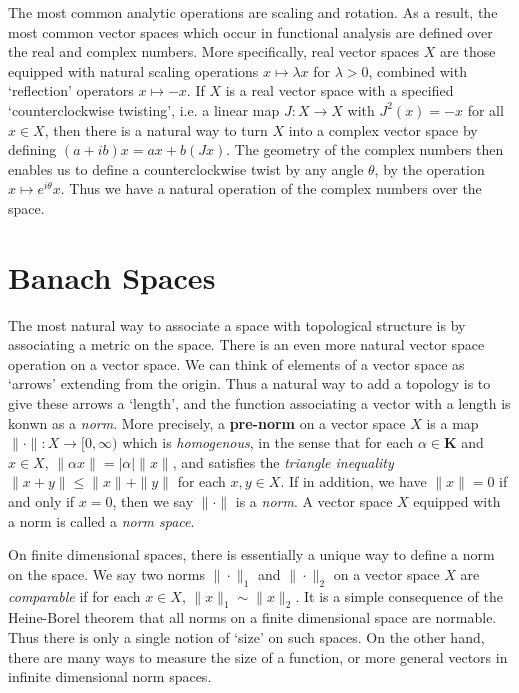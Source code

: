 The most common analytic operations are scaling and rotation. As a result, the most common vector spaces which occur in functional analysis are defined over the real and complex numbers. More specifically, real vector spaces $X$ are those equipped with natural scaling operations $x \mapsto \lambda x$ for $\lambda > 0$, combined with `reflection' operators $x \mapsto -x$. If $X$ is a real vector space with a specified `counterclockwise twisting', i.e. a linear map $J: X \to X$ with $J^2(x) = -x$ for all $x \in X$, then there is a natural way to turn $X$ into a complex vector space by defining $(a + ib)x = ax + b(Jx)$. The geometry of the complex numbers then enables us to define a counterclockwise twist by any angle $\theta$, by the operation $x \mapsto e^{i\theta} x$. Thus we have a natural operation of the complex numbers over the space.





\chapter{Banach Spaces}

The most natural way to associate a space with topological structure is by associating a metric on the space. There is an even more natural vector space operation on a vector space. We can think of elements of a vector space as `arrows' extending from the origin. Thus a natural way to add a topology is to give these arrows a `length', and the function associating a vector with a length is konwn as a {\it norm}. More precisely, a {\bf pre-norm} on a vector space $X$ is a map $\| \cdot \|: X \to [0,\infty)$ which is {\it homogenous}, in the sense that for each $\alpha \in \mathbf{K}$ and $x \in X$, $\| \alpha x \| = |\alpha| \| x \|$, and satisfies the {\it triangle inequality} $\| x + y \| \leq \| x \| + \| y \|$ for each $x,y \in X$. If in addition, we have $\| x \| = 0$ if and only if $x = 0$, then we say $\| \cdot \|$ is a {\it norm}. A vector space $X$ equipped with a norm is called a {\it norm space}.

On finite dimensional spaces, there is essentially a unique way to define a norm on the space. We say two norms $\| \cdot \|_1$ and $\| \cdot \|_2$ on a vector space $X$ are {\it comparable} if for each $x \in X$, $\| x \|_1 \sim \| x \|_2$. It is a simple consequence of the Heine-Borel theorem that all norms on a finite dimensional space are normable. Thus there is only a single notion of `size' on such spaces. On the other hand, there are many ways to measure the size of a function, or more general vectors in infinite dimensional norm spaces.

